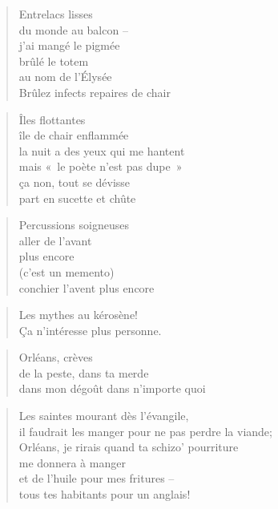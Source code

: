   \begin{verse}
    Entrelacs lisses\\
    du monde au balcon --\\
    j’ai mangé le pigmée\\
    brûlé le totem\\
    au nom de l’Élysée\\
    Brûlez infects repaires de chair
  \end{verse}
  \begin{verse}
    Îles flottantes\\
    île de chair enflammée\\
    la nuit a des yeux qui me hantent\\
    mais «~le poète n’est pas dupe~»\\
    ça non, tout se dévisse\\
    part en sucette et chûte
  \end{verse}
  \begin{verse}
    Percussions soigneuses\\
    aller de l’avant\\
    plus encore\\
    (c’est un memento)\\
    conchier l’avent
    plus encore
  \end{verse}
  \begin{verse}
    Les mythes au kérosène!\\
    Ça n’intéresse plus personne.
  \end{verse}
  \begin{verse}
    Orléans, crèves\\
    de la peste, dans ta merde\\
    dans mon dégoût dans n’importe quoi
  \end{verse}
  \begin{verse}
    Les saintes mourant dès l’évangile,\\
    il faudrait les manger pour ne pas perdre la viande;\\
    Orléans, je rirais quand ta schizo’ pourriture\\
    me donnera à manger\\
    et de l’huile pour mes fritures --\\
    tous tes habitants pour un anglais!
  \end{verse}

